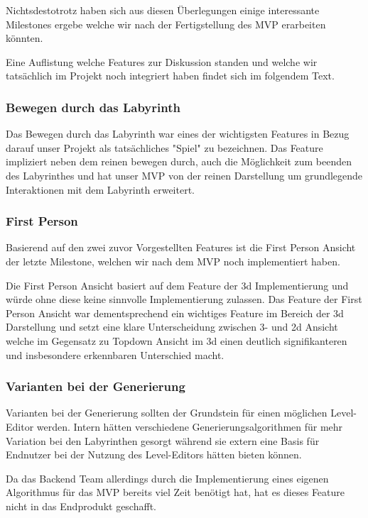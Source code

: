     Nichtsdestotrotz haben sich aus diesen Überlegungen einige interessante Milestones ergebe welche wir nach der Fertigstellung des MVP erarbeiten könnten.
    
    Eine Auflistung welche Features zur Diskussion standen und welche wir tatsächlich im Projekt noch integriert haben findet sich im folgendem Text.


    \subsubsection*{Bewegen durch das Labyrinth}
        Das Bewegen durch das Labyrinth war eines der wichtigsten Features in Bezug darauf unser Projekt als tatsächliches "Spiel" zu bezeichnen. Das Feature impliziert neben dem reinen bewegen durch, auch die Möglichkeit zum beenden des Labyrinthes und hat unser MVP von der reinen Darstellung um grundlegende Interaktionen mit dem Labyrinth erweitert.

    \subsubsection*{First Person}
        Basierend auf den zwei zuvor Vorgestellten Features ist die First Person Ansicht der letzte Milestone, welchen wir nach dem MVP noch implementiert haben. 
        
        Die First Person Ansicht basiert auf dem Feature der 3d Implementierung und würde ohne diese keine sinnvolle Implementierung zulassen. Das Feature der First Person Ansicht war dementsprechend ein wichtiges Feature im Bereich der 3d Darstellung und setzt eine klare Unterscheidung zwischen 3- und 2d Ansicht welche im Gegensatz zu Topdown Ansicht im 3d einen deutlich signifikanteren und insbesondere erkennbaren Unterschied macht.    

    \subsubsection*{Varianten bei der Generierung}
        Varianten bei der Generierung sollten der Grundstein für einen möglichen Level-Editor werden. Intern hätten verschiedene Generierungsalgorithmen für mehr Variation bei den Labyrinthen gesorgt während sie extern eine Basis für Endnutzer bei der Nutzung des Level-Editors hätten bieten können.
        
        Da das Backend Team allerdings durch die Implementierung eines eigenen Algorithmus für das MVP bereits viel Zeit benötigt hat, hat es dieses Feature nicht in das Endprodukt geschafft. 


